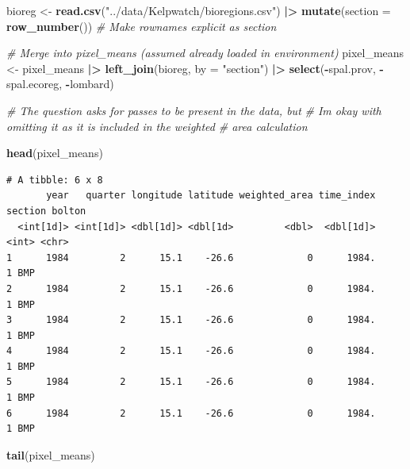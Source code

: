 \documentclass[
  british,
  10pt,
]{article}
\newenvironment{Shaded}{\begin{snugshade}}{\end{snugshade}}
\newcommand{\AttributeTok}[1]{\textcolor[rgb]{0.13,0.29,0.53}{#1}}
\newcommand{\CommentTok}[1]{\textcolor[rgb]{0.56,0.35,0.01}{\textit{#1}}}
\newcommand{\FunctionTok}[1]{\textcolor[rgb]{0.13,0.29,0.53}{\textbf{#1}}}
\newcommand{\NormalTok}[1]{#1}
\newcommand{\OtherTok}[1]{\textcolor[rgb]{0.56,0.35,0.01}{#1}}
\newcommand{\SpecialCharTok}[1]{\textcolor[rgb]{0.81,0.36,0.00}{\textbf{#1}}}
\newcommand{\StringTok}[1]{\textcolor[rgb]{0.31,0.60,0.02}{#1}}
\begin{document}
\begin{Shaded}
\begin{Highlighting}[]
\NormalTok{bioreg }\OtherTok{\textless{}{-}} \FunctionTok{read.csv}\NormalTok{(}\StringTok{"../data/Kelpwatch/bioregions.csv"}\NormalTok{) }\SpecialCharTok{|\textgreater{}} 
  \FunctionTok{mutate}\NormalTok{(}\AttributeTok{section =} \FunctionTok{row\_number}\NormalTok{())  }\CommentTok{\# Make rownames explicit as \textquotesingle{}section\textquotesingle{}}

\CommentTok{\# Merge into pixel\_means (assumed already loaded in environment)}
\NormalTok{pixel\_means }\OtherTok{\textless{}{-}}\NormalTok{ pixel\_means }\SpecialCharTok{|\textgreater{}}
  \FunctionTok{left\_join}\NormalTok{(bioreg, }\AttributeTok{by =} \StringTok{"section"}\NormalTok{) }\SpecialCharTok{|\textgreater{}} 
  \FunctionTok{select}\NormalTok{(}\SpecialCharTok{{-}}\NormalTok{spal.prov, }\SpecialCharTok{{-}}\NormalTok{spal.ecoreg, }\SpecialCharTok{{-}}\NormalTok{lombard)}

\CommentTok{\# The question asks for passes to be present in the data, but }
\CommentTok{\# I\textquotesingle{}m okay with omitting it as it is included in the weighted}
\CommentTok{\# area calculation}

\FunctionTok{head}\NormalTok{(pixel\_means)}
\end{Highlighting}
\end{Shaded}

\begin{verbatim}
# A tibble: 6 x 8
       year   quarter longitude latitude weighted_area time_index section bolton
  <int[1d]> <int[1d]> <dbl[1d]> <dbl[1d>         <dbl>  <dbl[1d]>   <int> <chr> 
1      1984         2      15.1    -26.6             0      1984.       1 BMP   
2      1984         2      15.1    -26.6             0      1984.       1 BMP   
3      1984         2      15.1    -26.6             0      1984.       1 BMP   
4      1984         2      15.1    -26.6             0      1984.       1 BMP   
5      1984         2      15.1    -26.6             0      1984.       1 BMP   
6      1984         2      15.1    -26.6             0      1984.       1 BMP   
\end{verbatim}

\begin{Shaded}
\begin{Highlighting}[]
\FunctionTok{tail}\NormalTok{(pixel\_means)}
\end{Highlighting}
\end{Shaded}
\end{document}
